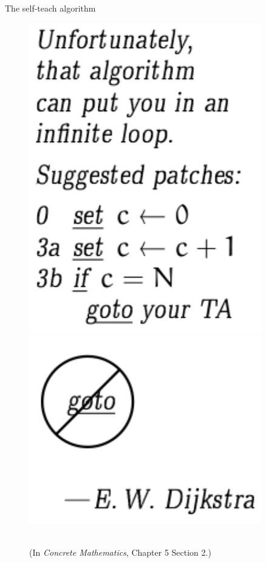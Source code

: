 \documentclass[handout]{beamer}
\begin{document}
\begin{frame}{The self-teach algorithm}
\begin{figure}[htbp]
\begin{minipage}{0.3\textwidth}
            \includegraphics[width=0.9\textwidth]{img/self-teach2.png}
        \end{minipage}
        \begin{minipage}{0.3\textwidth}
            \centering
            \includegraphics[width=0.9\textwidth]{img/nogoto.png}
        \end{minipage}\\
        (In \textit{Concrete Mathematics}, Chapter 5 Section 2.)
    \end{figure}
\end{frame}
\end{document}
